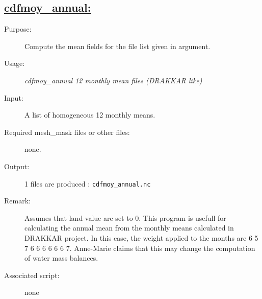 \documentclass[a4paper,11pt]{article}
\begin{document}
\subsection*{\underline{cdfmoy\_annual:}}
\begin{description}
\item[Purpose:] Compute the mean fields for the file list given in argument.
\item[Usage:] {\em cdfmoy\_annual 12 monthly mean files (DRAKKAR like)}
\item[Input:] A list of homogeneous 12 monthly means.
\item[Required mesh\_mask files or other files:]  none.
\item[Output:] 1 files are produced : {\tt cdfmoy\_annual.nc}
\item[Remark:] Assumes that land value are set to 0.  This program is usefull for calculating the annual mean from the monthly means
calculated in DRAKKAR  project. In this case, the weight applied to the months are 6 5 7 6 6 6 6 6 6 7. Anne-Marie claims that this
may change the computation of water mass balances.
\item[Associated script:] none
\end{description}

\newpage
\end{document}
